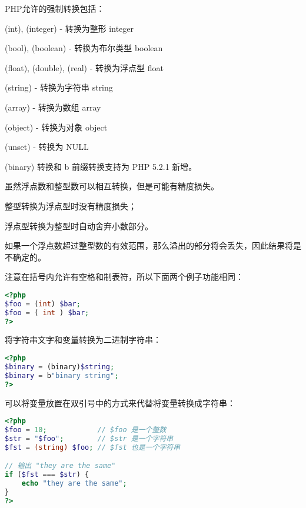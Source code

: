 PHP允许的强制转换包括：

\begin{compactitem}
\item (int), (integer) - 转换为整形 integer
\item (bool), (boolean) - 转换为布尔类型 boolean
\item (float), (double), (real) - 转换为浮点型 float
\item (string) - 转换为字符串 string
\item (array) - 转换为数组 array
\item (object) - 转换为对象 object
\item (unset) - 转换为 NULL
\end{compactitem}



(binary) 转换和 b 前缀转换支持为 PHP 5.2.1 新增。

虽然浮点数和整型数可以相互转换，但是可能有精度损失。

\begin{compactitem}
\item 整型转换为浮点型时没有精度损失；
\item 浮点型转换为整型时自动舍弃小数部分。
\end{compactitem}

如果一个浮点数超过整型数的有效范围，那么溢出的部分将会丢失，因此结果将是不确定的。

注意在括号内允许有空格和制表符，所以下面两个例子功能相同：



\begin{lstlisting}[language=PHP]
<?php
$foo = (int) $bar;
$foo = ( int ) $bar;
?>
\end{lstlisting}

将字符串文字和变量转换为二进制字符串：


\begin{lstlisting}[language=PHP]
<?php
$binary = (binary)$string;
$binary = b"binary string";
?>
\end{lstlisting}

可以将变量放置在双引号中的方式来代替将变量转换成字符串：


\begin{lstlisting}[language=PHP]
<?php
$foo = 10;            // $foo 是一个整数
$str = "$foo";        // $str 是一个字符串
$fst = (string) $foo; // $fst 也是一个字符串

// 输出 "they are the same"
if ($fst === $str) {
    echo "they are the same";
}
?>
\end{lstlisting}

